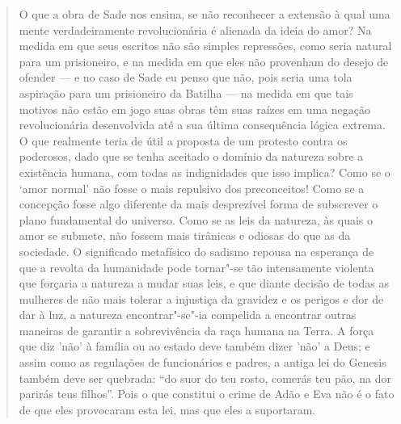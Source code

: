 \begin{quote}
O que a obra de Sade nos ensina, se não reconhecer a extensão à qual uma
mente verdadeiramente revolucionária é alienada da ideia do amor? Na
medida em que seus escritos não são simples repressões, como seria
natural para um prisioneiro, e na medida em que eles não provenham do
desejo de ofender --- e no caso de Sade eu penso que não, pois seria uma
tola aspiração para um prisioneiro da Batilha --- na medida em que tais
motivos não estão em jogo suas obras têm suas raízes em uma negação
revolucionária desenvolvida até a sua última consequência lógica
extrema. O que realmente teria de útil a proposta de um protesto contra
os poderosos, dado que se tenha aceitado o domínio da natureza sobre a
existência humana, com todas as indignidades que isso implica? Como se o
`amor normal' não fosse o mais repulsivo dos preconceitos! Como se a
concepção fosse algo diferente da mais desprezível forma de subscrever o
plano fundamental do universo. Como se as leis da natureza, às quais o
amor se submete, não fossem mais tirânicas e odiosas do que as da
sociedade. O significado metafísico do sadismo repousa na esperança de
que a revolta da humanidade pode tornar"-se tão intensamente violenta que
forçaria a natureza a mudar suas leis, e que diante decisão de todas as
mulheres de não mais tolerar a injustiça da gravidez e os perigos e dor
de dar à luz, a natureza encontrar"-se"-ia compelida a encontrar outras
maneiras de garantir a sobrevivência da raça humana na Terra. A força
que diz 'não' à família ou ao estado deve também dizer 'não' a Deus; e
assim como as regulações de funcionários e padres, a antiga lei do
Genesis também deve ser quebrada: ``do suor do teu rosto, comerás teu
pão, na dor parirás teus filhos''. Pois o que constitui o crime de Adão
e Eva não é o fato de que eles provocaram esta lei, mas que eles a
suportaram.
\end{quote}

